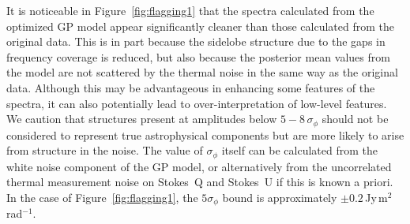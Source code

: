 \documentclass[fleqn,usenatbib]{mnras}
\begin{document}
It is noticeable in Figure~\ref{fig:flagging1} that the spectra calculated from the optimized GP model appear significantly cleaner than those calculated from the original data. This is in part because the sidelobe structure due to the gaps in frequency coverage is reduced, but also because the posterior mean values from the model are not scattered by the thermal noise in the same way as the original data. Although this may be advantageous in enhancing some features of the spectra, it can also potentially lead to over-interpretation of low-level features. We caution that structures present at amplitudes below $5-8\,\sigma_{\phi}$ should not be considered to represent true astrophysical components but are more likely to arise from structure in the noise. The value of $\sigma_{\phi}$ itself can be calculated from the white noise component of the GP model, or alternatively from the uncorrelated thermal measurement noise on Stokes~Q and Stokes~U if this is known a priori. In the case of Figure~\ref{fig:flagging1}, the $5\sigma_{\phi}$ bound is approximately $\pm0.2$\,Jy\,m$^2$\,rad$^{-1}$.
\end{document}
